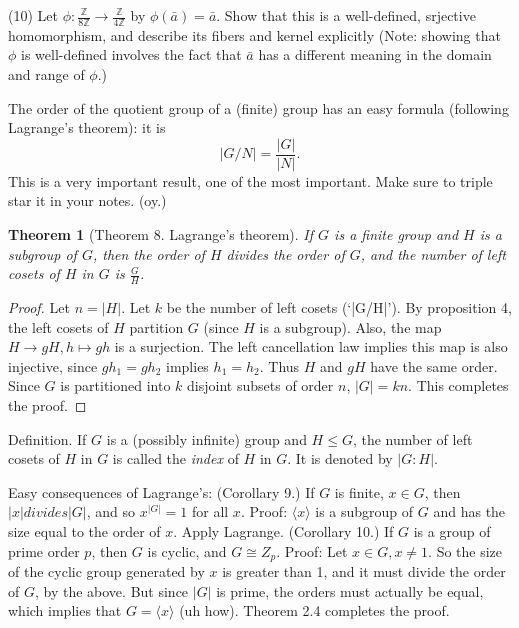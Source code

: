 \documentclass[1    0pt, answers]{exam} \renewcommand{\baselinestretch}{1.05}
\theoremstyle{plain}
\newtheorem{theorem}{Theorem}
\theoremstyle{definition}
\begin{document}
\begin{questions}
\question (10) Let $\phi : \frac{\mathbb{Z}}{8 \mathbb{Z}} \to \frac{\mathbb{Z}}{4 \mathbb{Z}}$ by $\phi(\bar{a}) = \bar{a}$. Show that this is a well-defined, srjective homomorphism, and describe its fibers and kernel explicitly (Note: showing that $\phi$ is well-defined involves the fact that $\bar{a}$ has a different meaning in the domain and range of $\phi$.)

The order of the quotient group of a (finite) group has an easy formula (following Lagrange's theorem): it is 
\begin{equation}
|G/N| = \frac{|G|}{|N|}.
\end{equation}
This is a very important result, one of the most important. Make sure to triple star it in your notes. (oy.)

\begin{theorem}[Theorem 8. Lagrange's theorem]
If $G$ is a finite group and $H$ is a subgroup of $G$, then the order of $H$ divides the order of $G$, and the number of left cosets of $H$ in $G$ is $\frac{G}{H}$.
\end{theorem}
\begin{proof}
Let $n = |H|$. Let $k$ be the number of left cosets (`|G/H|'). By proposition 4, the left cosets of $H$ partition $G$ (since $H$ is a subgroup). Also, the map $H \to gH, h \mapsto gh$ is a surjection. The left cancellation law implies this map is also injective, since $gh_1 = gh_2$ implies $h_1 = h_2$. Thus $H$ and $gH$ have the same order.
Since $G$ is partitioned into $k$ disjoint subsets of order $n$, $|G| = kn$. This completes the proof.
\end{proof}

Definition. If $G$ is a (possibly infinite) group and $H \leq G$, the number of left cosets of $H$ in $G$ is called the \emph{index} of $H$ in $G$. It is denoted by $|G : H|$.

Easy consequences of Lagrange's:
(Corollary 9.) If $G$ is finite, $x \in G$, then $|x| divides |G|$, and so $x^{|G|} = 1$ for all $x$. Proof: $\langle x \rangle$ is a subgroup of $G$ and has the size equal to the order of $x$. Apply Lagrange.
(Corollary 10.) If $G$ is a group of prime order $p$, then $G$ is cyclic, and $G \cong Z_p$. Proof: Let $x \in G, x \neq 1$. So the size of the cyclic group generated by $x$ is greater than 1, and it must divide the order of $G$, by the above. But since $|G|$ is prime, the orders must actually be equal, which implies that $G = \langle x \rangle$ (uh how). Theorem 2.4 completes the proof.


\end{questions}
\end{document}
